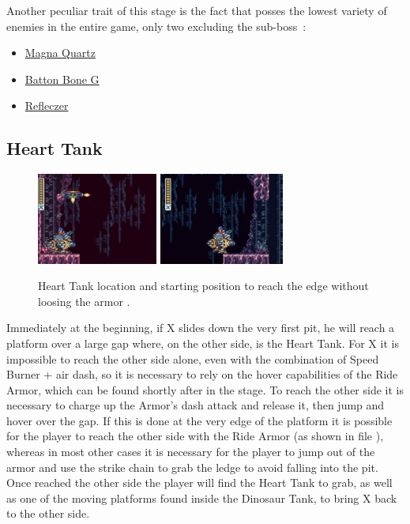 Another peculiar trait of this stage is the fact that posses the lowest variety of enemies in the entire game, only two excluding the sub-boss~\cite{wiki:Energen_mine}:
\begin{itemize}
	\item \hyperlink {miniboss:Magna_Quartz}{Magna Quartz}
	\item \hyperlink {enem:Batton_Bone_type_G}{Batton Bone G}
	\item \hyperlink {enem:Refleczer}{Refleczer}
\end{itemize}

\subsection{Heart Tank}
\begin{figure}[htp]
	\centering
	\includegraphics[height=3cm]{figures/X2/Crystal_snail/Crystal_heart.png}
	\includegraphics[height=3cm]{figures/X2/Crystal_snail/Crystal_heart_starting_spot.png}
	\caption{Heart Tank location and starting position to reach the edge without loosing the armor .}
\end{figure}
Immediately at the beginning, if X slides down the very first pit, he will reach a platform over a large gap where, on the other side, is the Heart Tank. For X it is impossible to reach the other side alone, even with the combination of Speed Burner + air dash, so it is necessary to rely on the hover capabilities of the Ride Armor, which can be found shortly after in the stage. To reach the other side it is necessary to charge up the Armor's dash attack and release it, then jump and hover over the gap. If this is done at the very edge of the platform it is possible for the player to reach the other side with the Ride Armor (as shown in file ), whereas in most other cases it is necessary for the player to jump out of the armor and  use the strike chain to grab the ledge to avoid falling into the pit. Once reached the other side the player will find the Heart Tank to grab, as well as one of the moving platforms found inside the Dinosaur Tank, to bring X back to the other side.


